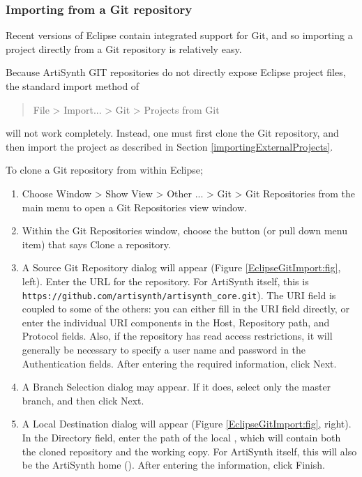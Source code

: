 \subsubsection{Importing from a Git repository}
\label{importingFromGit}

Recent versions of Eclipse contain integrated support for Git, and so
importing a project directly from a Git repository is relatively easy.

Because ArtiSynth GIT repositories do not directly expose Eclipse
project files, the standard import method of
%
\begin{quote}
{\sf File > Import... > Git > Projects from Git}
\end{quote}
%
will not work completely. Instead, one must
first clone the Git repository, and then import the
project \directory{} as described in
Section \ref{importingExternalProjects}.

To clone a Git repository from within Eclipse;

\begin{enumerate}

\item Choose {\sf Window > Show View > Other ... > Git > Git Repositories} 
from the main menu to open a {\sf Git Repositories} view window.

\item Within the {\sf Git Repositories} window, choose the
button (or pull down menu item) that says {\sf Clone a repository}.

\item 
A {\sf Source Git Repository} dialog will appear (Figure
\ref{EclipseGitImport:fig}, left). Enter the URL for the
repository. For ArtiSynth itself, this is {\tt
https://github.com/artisynth/artisynth\_core.git}).  The {\sf URI}
field is coupled to some of the others: you can either fill in the
{\sf URI} field directly, or enter the individual URI components in
the {\sf Host}, {\sf Repository path}, and {\sf Protocol} fields.
Also, if the repository has read access restrictions, it will
generally be necessary to specify a user name and password in the {\sf
Authentication} fields.  After entering the required information,
click {\sf Next}. 

\item A {\sf Branch Selection} dialog may appear. If it does,
select only the {\sf master} branch, and then click {\sf Next}.

\item A {\sf Local Destination} dialog will appear (Figure
\ref{EclipseGitImport:fig}, right). In the {\sf Directory} field, enter
the path of the local \directory{}, which will contain both the cloned
repository and the working copy.  For ArtiSynth itself, this will also
be the ArtiSynth home \directory{} (\ArtHome[]).  After
entering the \directory{} information, click {\sf Finish}.

\end{enumerate}

